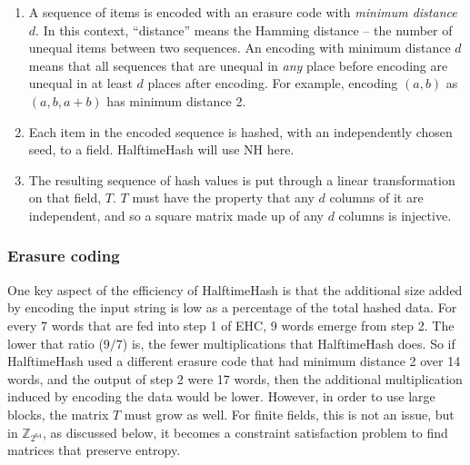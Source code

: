 \documentclass[sigconf, nonacm]{acmart}
\newcommand{\ints}{\mathbb{Z}}
\begin{document}
\begin{enumerate}
\item A sequence of items is encoded with an erasure code with {\em minimum distance $d$}.
  In this context, ``distance'' means the Hamming distance -- the number of unequal items between two sequences.
  An encoding with minimum distance $d$ means that all sequences that are unequal in {\em any} place before encoding are unequal in at least $d$ places after encoding.
  For example, encoding $(a,b)$ as $(a,b,a+b)$ has minimum distance 2.
\item Each item in the encoded sequence is hashed, with an independently chosen seed, to a field.
  HalftimeHash will use NH here. %
\item The resulting sequence of hash values is put through a linear transformation on that field, $T$.
  $T$ must have the property that any $d$ columns of it are independent, and so a square matrix made up of any $d$ columns is injective.
\end{enumerate}



\subsubsection{Erasure coding}

One key aspect of the efficiency of HalftimeHash is that the additional size added by encoding the input string is low as a percentage of the total hashed data.
For every 7 words that are fed into step 1 of EHC, 9 words emerge from step 2.
The lower that ratio ($9/7$) is, the fewer multiplications that HalftimeHash does.
So if HalftimeHash used a different erasure code that had minimum distance 2 over 14 words, and the output of step 2 were 17 words, then the additional multiplication induced by encoding the data would be lower.
However, in order to use large blocks, the matrix $T$ must grow as well.
For finite fields, this is not an issue, but in $\ints_{2^{64}}$, as discussed below, it becomes a constraint satisfaction problem to find matrices that preserve entropy.
\end{document}
